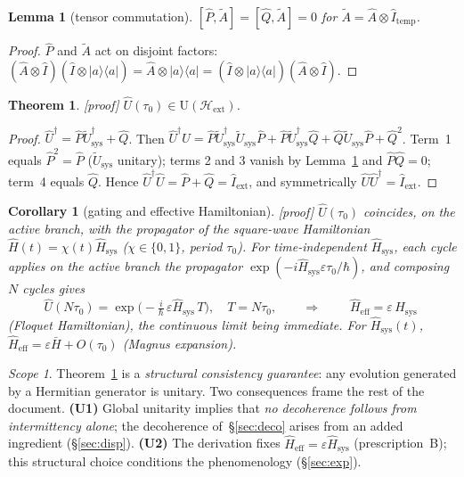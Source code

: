 \documentclass[11pt,a4paper]{article}
\newcommand{\ket}[1]{\lvert #1\rangle}
\newcommand{\bra}[1]{\langle #1\rvert}
\newcommand{\Hext}{\mathcal{H}_{\mathrm{ext}}}
\newcommand{\Hsysop}{\hat{H}_{\mathrm{sys}}}
\newcommand{\Heff}{\hat{H}_{\mathrm{eff}}}
\newcommand{\Iext}{\hat{I}_{\mathrm{ext}}}
\newcommand{\statut}[1]{{\footnotesize\textsf{[#1]}}}
\theoremstyle{plain}
\newtheorem{theorem}{Theorem}
\newtheorem{lemma}{Lemma}
\newtheorem{corollary}{Corollary}
\theoremstyle{definition}
\theoremstyle{remark}
\newtheorem*{scope}{Scope}
\begin{document}
\begin{lemma}[tensor commutation]\label{lem:comm}
$[\hat{P},\tilde{A}]=[\hat{Q},\tilde{A}]=0$ for $\tilde{A}=\hat{A}\otimes\hat{I}_{\mathrm{temp}}$.
\end{lemma}
\begin{proof}
$\hat{P}$ and $\tilde A$ act on disjoint factors:
$(\hat A\otimes\hat I)(\hat I\otimes\ket{a}\bra{a})=\hat A\otimes\ket{a}\bra{a}
=(\hat I\otimes\ket{a}\bra{a})(\hat A\otimes\hat I)$.
\end{proof}

\begin{theorem}\label{thm:unit}\statut{proof}
$\hat{U}(\tau_0)\in\mathrm{U}(\Hext)$.
\end{theorem}
\begin{proof}
$\hat{U}^\dagger=\hat{P}\tilde{U}_{\mathrm{sys}}^\dagger+\hat{Q}$. Then
$\hat{U}^\dagger\hat{U}
=\hat{P}\tilde{U}_{\mathrm{sys}}^\dagger\tilde{U}_{\mathrm{sys}}\hat{P}
+\hat{P}\tilde{U}_{\mathrm{sys}}^\dagger\hat{Q}
+\hat{Q}\tilde{U}_{\mathrm{sys}}\hat{P}+\hat{Q}^2$.
Term~1 equals $\hat P^2=\hat P$ ($\tilde U_{\mathrm{sys}}$ unitary); terms 2 and 3
vanish by Lemma~\ref{lem:comm} and $\hat P\hat Q=0$; term~4 equals $\hat Q$. Hence
$\hat U^\dagger\hat U=\hat P+\hat Q=\Iext$, and symmetrically
$\hat U\hat U^\dagger=\Iext$.
\end{proof}

\begin{corollary}[gating and effective Hamiltonian]\label{cor:floquet}\statut{proof}
$\hat U(\tau_0)$ coincides, on the active branch, with the propagator of the
square-wave Hamiltonian $\hat H(t)=\chi(t)\Hsysop$ ($\chi\in\{0,1\}$, period
$\tau_0$). For time-independent $\Hsysop$, each cycle applies on the active branch the propagator $\exp(-i\Hsysop\varepsilon\tau_0/\hbar)$, and composing $N$ cycles gives
\[
\hat U(N\tau_0)=\exp\!\big(-\tfrac{i}{\hbar}\,\varepsilon\Hsysop\,T\big),
\quad T=N\tau_0,
\qquad\Longrightarrow\qquad
\boxed{\;\Heff=\varepsilon\,\Hsysop\;}
\]
(Floquet Hamiltonian), the continuous limit being immediate. For $\Hsysop(t)$,
$\Heff=\varepsilon\bar{H}+O(\tau_0)$ (Magnus expansion).
\end{corollary}

\begin{scope}
Theorem~\ref{thm:unit} is a \emph{structural consistency guarantee}: any
evolution generated by a Hermitian generator is unitary. Two consequences frame
the rest of the document.
\textbf{(U1)} Global unitarity implies that \emph{no decoherence follows from
intermittency alone}; the decoherence of~\S\ref{sec:deco} arises from an added
ingredient (\S\ref{sec:disp}). \textbf{(U2)} The derivation fixes
$\Heff=\varepsilon\Hsysop$ (prescription~B); this structural choice conditions the
phenomenology (\S\ref{sec:exp}).
\end{scope}
\end{document}
